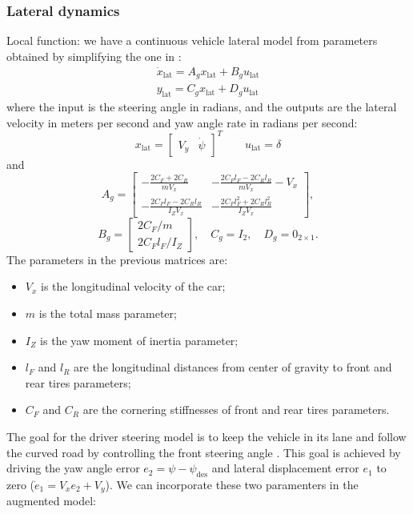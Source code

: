 \documentclass[conference,11pt]{IEEEtran}
\renewcommand{\vec}[1]{\ensuremath{\boldsymbol{\mathit{#1}}}}
\begin{document}
\subsubsection{Lateral dynamics}
Local function: we have a continuous vehicle lateral model from parameters obtained by simplifying the one in \cite{rathai}: 
\begin{equation}
\label{eqn:lateral_dynamics_simple_model}
\begin{array}{ll}
\dot{\vec{x}}_{\text{lat}} =\vec{A}_g \vec{x}_{\text{lat}}+ \vec{B}_g \vec{u}_{\text{lat}}\\
\vec{y}_{\text{lat}} =\vec{C}_g \vec{x}_{\text{lat}} + \vec{D}_g \vec{u}_{\text{lat}}
\end{array}
\end{equation}
where the input is the steering angle in radians, and the outputs are the lateral velocity in meters per second and yaw angle rate in radians per second:
\begin{equation*}
\vec{x}_{\text{lat}} = \begin{bmatrix}
V_y&\dot{\psi}
\end{bmatrix}^T
\qquad
\vec{u}_{\text{lat}} = \delta
\end{equation*}
and
\[ 
\vec{A}_g=\begin{bmatrix}
-\frac{2C_F+2C_R}{mV_x}&-\frac{2C_Fl_F-2C_Rl_R}{mV_x} - V_x\\
-\frac{2C_Fl_F-2C_Rl_R}{I_ZV_x}&-\frac{2C_Fl_F^2+2C_Rl_R^2}{I_ZV_x}
\end{bmatrix},
\]
\[
\vec{B}_g=\begin{bmatrix}
2C_F/m\\
2C_Fl_F/I_Z
\end{bmatrix},
\quad
\vec{C}_g=\vec{I}_2, 
\quad
\vec{D}_g=\vec{0}_{2\times1}.
\]
The parameters in the previous matrices are:
\begin{itemize}
	\item $V_x$ is the longitudinal velocity of the car;	
	\item $m$ is the total mass parameter; 
	\item $I_Z$ is the yaw moment of inertia parameter;
	\item $l_F$ and $l_R$ are the longitudinal distances from center of gravity to front and rear tires parameters;
	\item $C_F$ and $C_R$ are the cornering stiffnesses of front and rear tires parameters.
\end{itemize}
The goal for the driver steering model is to keep the vehicle in its lane and follow the curved road by controlling the front steering angle . This goal is achieved by driving the yaw angle error $e_2 = \psi -\psi_{\text{des}}$ and lateral displacement error $e_1$ to zero ($\dot{e}_1 = V_xe_2+V_y$). We can incorporate these two paramenters in the augmented model:
\end{document}
